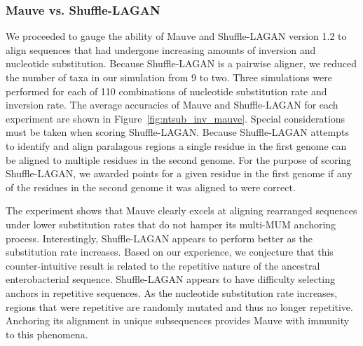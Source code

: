 \documentclass[titlepage,11pt]{article}
\begin{document}
\subsubsection*{Mauve vs. Shuffle-LAGAN}
We proceeded to gauge the ability of Mauve and Shuffle-LAGAN version 1.2 to
align sequences that had undergone increasing amounts of inversion and
nucleotide substitution. Because Shuffle-LAGAN is a pairwise aligner, we
reduced the number of taxa in our simulation from 9 to two.  Three simulations
were performed for each of 110 combinations of nucleotide substitution rate and
inversion rate.  The average accuracies of Mauve and Shuffle-LAGAN for each
experiment are shown in Figure~\ref{fig:ntsub_inv_mauve}.  Special
considerations must be taken when scoring Shuffle-LAGAN.  Because Shuffle-LAGAN
attempts to identify and align paralagous regions
a single residue in the first genome can be aligned to multiple
residues in the second genome.  For the purpose of scoring Shuffle-LAGAN, we
awarded points for a given residue in the first genome if any of the residues
in the second genome it was aligned to were correct.  

The experiment shows that
Mauve clearly excels at aligning rearranged sequences under lower substitution
rates that do not hamper its multi-MUM anchoring process.  Interestingly,
Shuffle-LAGAN appears to perform better as the substitution rate increases.
Based on our experience, we conjecture that this counter-intuitive result is related to
the repetitive nature of the ancestral enterobacterial sequence. Shuffle-LAGAN
appears to have difficulty selecting anchors in repetitive sequences.  As the
nucleotide substitution rate increases, regions that were repetitive are
randomly mutated and thus no longer repetitive.  Anchoring its alignment in
unique subsequences provides Mauve with immunity to this phenomena.

\end{document}
